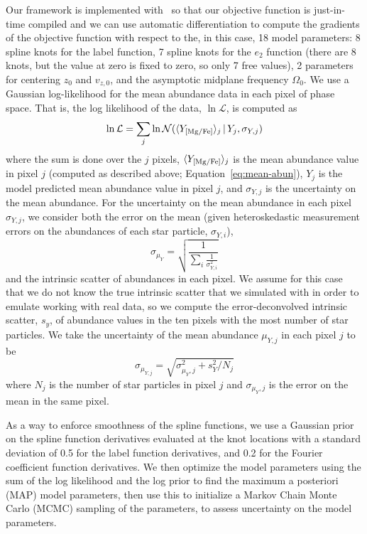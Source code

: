 \documentclass[modern]{aastex631}
\newcommand{\freqzero}{\ensuremath{\Omega_0}}
\begin{document}
Our framework is implemented with \jax\ so that our objective function is just-in-time
compiled and we can use automatic differentiation to compute the gradients of the
objective function with respect to the, in this case, 18 model parameters: 8 spline
knots for the label function, 7 spline knots for the $e_2$ function (there are 8 knots,
but the value at zero is fixed to zero, so only 7 free values), 2 parameters for
centering $z_0$ and $v_{z, 0}$, and the asymptotic midplane frequency $\freqzero$.
We use a Gaussian log-likelihood for the mean  abundance data in each pixel
of phase space.
That is, the log likelihood of the data, $\ln \mathcal{L}$, is computed as
\begin{equation}
    \ln \mathcal{L} = \sum_j \ln
        \mathcal{N}(\langle Y_{{[\mathrm{Mg}/\mathrm{Fe}]}} \rangle_j \,|\, Y_j, \sigma_{Y, j})
\end{equation}
where the sum is done over the $j$ pixels, $\langle Y_{{[\mathrm{Mg}/\mathrm{Fe}]}} \rangle_j$ is the
mean abundance value in pixel $j$ (computed as described above;
Equation~\ref{eq:mean-abun}), $Y_j$ is the model predicted mean abundance value in pixel
$j$, and $\sigma_{Y, j}$ is the uncertainty on the mean abundance.
For the uncertainty on the mean abundance in each pixel $\sigma_{Y, j}$, we consider
both the error on the mean (given heteroskedastic measurement errors on the abundances
of each star particle, $\sigma_{Y,i}$),
\begin{equation}
    \sigma_{\mu_Y} = \sqrt{\frac{1}{\sum_i \frac{1}{\sigma^2_{Y,i}}}}
\end{equation}
and the intrinsic scatter of abundances in each pixel.
We assume for this case that we do not know the true intrinsic scatter that we simulated
with in order to emulate working with real data, so we compute the error-deconvolved
intrinsic scatter, $s_y$, of abundance values in the ten pixels with the most number of
star particles.
We take the uncertainty of the mean abundance $\mu_{Y,j}$ in each pixel $j$ to be
\begin{equation}
    \sigma_{\mu_{Y,j}} = \sqrt{\sigma_{\mu_Y, j}^2 + s_Y^2 / N_j}
\end{equation}
where $N_j$ is the number of star particles in pixel $j$ and $\sigma_{\mu_Y, j}$ is the
error on the mean in the same pixel.

As a way to enforce smoothness of the spline functions, we use a Gaussian prior on the
spline function derivatives evaluated at the knot locations with a standard deviation of
0.5 for the label function derivatives, and 0.2 for the Fourier coefficient function
derivatives.
We then optimize the model parameters using the sum of the log likelihood and the log
prior to find the maximum a posteriori (MAP) model parameters, then use this to
initialize a Markov Chain Monte Carlo (MCMC) sampling of the parameters, to assess
uncertainty on the model parameters.
\end{document}
